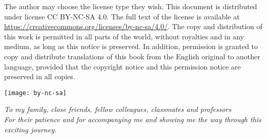 

\portadaNew

\portadaInt %


\begin{creditos}[\titulo] %
The author may choose the license type they wish. This document is distributed under license CC BY-NC-SA 4.0. The full text of the license is available at \url{https://creativecommons.org/licenses/by-nc-sa/4.0/}. The copy and distribution of this work is permitted in all parts of the world, without royalties and in any medium, as long as this notice is preserved. In addition, permission is granted to copy and distribute translations of this book from the English original to another language, provided that the copyright notice and this permission notice are preserved in all copies.

\noindent \texttt{[image: by-nc-sa]}

\end{creditos}




\begin{dedicatoria} %
\emph{To my family, close friends, fellow colleagues, classmates and professors \\ %
For their patience and for accompanying me and showing me the way through this exciting journey.}
\end{dedicatoria}

